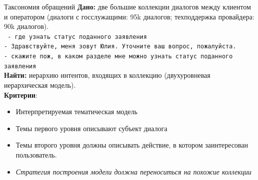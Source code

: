 \begin{frame}{Таксономия обращений}
	\textbf{Дано:} две большие коллекции диалогов между клиентом и оператором (диалоги с госслужащими: 95k диалогов; техподдержка провайдера: 90k диалогов).\\
\texttt{\footnotesize
- где узнать статус поданного заявления\\
- Здравствуйте, меня зовут Юлия. Уточните ваш вопрос, пожалуйста.\\
- скажите пож, в каком разделе мне можно узнать статус поданного заявления
}\\
	\textbf{Найти:} иерархию интентов, входящих в коллекцию (двухуровневая иерархическая модель). \\
	
	\textbf{Критерии}: {\small\begin{itemize}
	    \item Интерпретируемая тематическая модель
	    \item Темы первого уровня описывают субъект диалога
	    \item  Темы второго уровня должны описывать действие, в котором заинтересован пользователь.
	    \item  \emph{Стратегия построения модели должна переноситься на похожие коллекции}
	\end{itemize}}
\end{frame}

